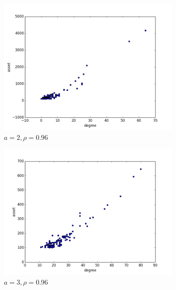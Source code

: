 \documentclass[a4paper, 11pt]{article}
\begin{document}
\begin{figure}[htbp]
    \centering
    \begin{subfigure}[b]{0.6\textwidth}
		\includegraphics[width=\textwidth]{images/scatter2.png}
        \caption{$a = 2, \rho=0.96$}
	\end{subfigure}
    \begin{subfigure}[b]{0.6\textwidth}
		\includegraphics[width=\textwidth]{images/scatter3.png}
        \caption{$a = 3, \rho=0.96$}
	\end{subfigure}
    \begin{subfigure}[b]{0.6\textwidth}

\end{subfigure}
\end{figure}
\end{document}
